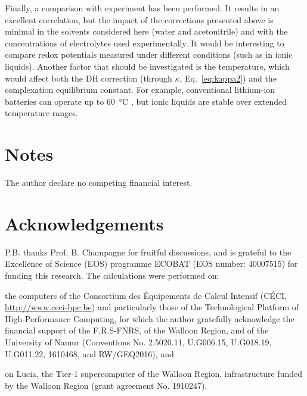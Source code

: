 \documentclass[review,preprint]{elsarticle}
\begin{document}
Finally, a comparison with experiment has been performed. It results in an excellent correlation, but the impact of the corrections presented above is minimal in the solvents considered here (water and acetonitrile) and with the concentrations of electrolytes used experimentally. It would be interesting to compare redox potentials measured under different conditions (such as in ionic liquids). Another factor that should be investigated is the temperature, which would affect both the DH correction (through $\kappa$, Eq.~\eqref{eq:kappa2}) and the complexation equilibrium constant. For example, conventional lithium-ion batteries can operate up to \SI{60}{\degreeCelsius} \cite{maTemperatureEffectThermal2018}, but ionic liquids are stable over extended temperature ranges.
	
\section*{Notes}
The author declare no competing financial interest.

\section*{Acknowledgements}
P.B. thanks Prof. B. Champagne for fruitful discussions, and is grateful to the Excellence of Science (EOS) programme  ECOBAT (EOS number: 40007515) for funding this research. 
The calculations were performed on: \begin{inparaenum}[(i)]
	\item the computers of the Consortium des \'{E}quipements de Calcul Intensif (C\'{E}CI, \url{http://www.ceci-hpc.be}) and particularly those of the Technological Platform of High-Performance Computing, for which the author gratefully acknowledge the financial support of the F.R.S-FNRS, of the Walloon Region, and of the University of Namur (Conventions No. 2.5020.11, U.G006.15, U.G018.19, U.G011.22, 1610468, and RW/GEQ2016), and
	\item on Lucia, the Tier-1 supercomputer of the Walloon Region, infrastructure funded by the Walloon Region (grant agreement No. 1910247).
\end{inparaenum} 
	
	
 

	
\end{document}
